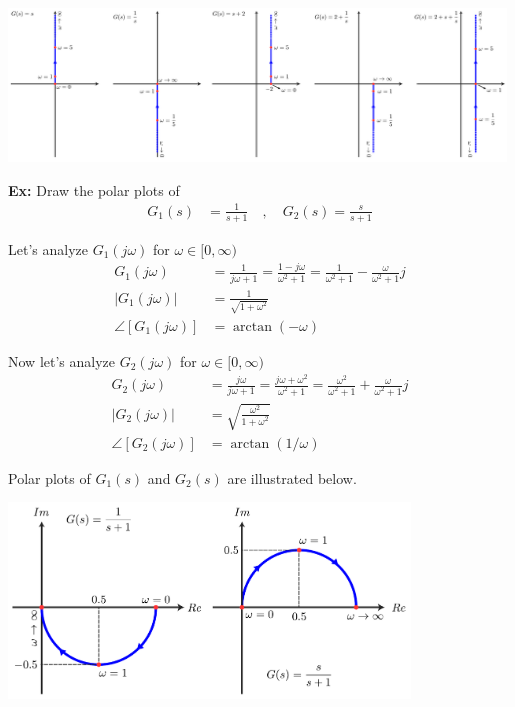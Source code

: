 \documentclass{article}
\begin{document}
  \begin{minipage}[h]{1\linewidth}
    \begin{center}
      \includegraphics[width=0.99\textwidth]{figs/polar}
    \end{center}
  \end{minipage}

\newpage

\textbf{Ex:} Draw the polar plots of 
%
\begin{align*}
 G_1(s) &= \frac{1}{s+1}
 \quad , \quad
 G_2(s) = \frac{s}{s+1}
\end{align*}

Let's analyze $G_1(j \omega)$ for $\omega \in [0 , \infty)$
%
\begin{align*}
 G_1(j \omega) &= \frac{1}{j \omega +1} = \frac{1 - j \omega}{\omega^2 +1} 
= \frac{1}{\omega^2 +1} - \frac{\omega}{\omega^2 +1} j
\\
| G_1(j \omega) | &= \frac{1}{ \sqrt{1 + \omega^2} }
\\
\angle [ G_1(j \omega) ] &= \arctan (-\omega) 
\end{align*}

Now let's analyze $G_2(j \omega)$ for $\omega \in [0 , \infty)$
%
\begin{align*}
 G_2(j \omega) &= \frac{j \omega}{j \omega +1} = \frac{j \omega + \omega^2}{\omega^2 +1} 
= \frac{\omega^2}{\omega^2 +1} + \frac{\omega}{\omega^2 +1} j
\\
| G_2(j \omega) | &= \sqrt{ \frac{ \omega^2 }{ 1 + \omega^2 } }
\\
\angle [ G_2(j \omega) ] &= \arctan (1 / \omega) 
\end{align*}

Polar plots of $G_1(s)$ and $G_2(s)$ are illustrated below. 

\vspace{6 pt}

  \begin{minipage}[h]{1\linewidth}
    \begin{center}
      \includegraphics[width=0.8\textwidth]{figs/polar2}
    \end{center}
  \end{minipage}
\end{document}
